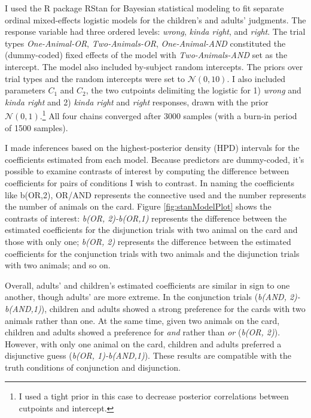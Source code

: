 \documentclass[man]{apa6}
\theoremstyle{definition}
\theoremstyle{definition}
\theoremstyle{definition}
\theoremstyle{remark}
\begin{document}
I used the R package RStan for Bayesian statistical modeling to fit
separate ordinal mixed-effects logistic models for the children's and
adults' judgments. The response variable had three ordered levels:
\emph{wrong}, \emph{kinda right}, and \emph{right}. The trial types
\emph{One-Animal-OR}, \emph{Two-Animals-OR}, \emph{One-Animal-AND}
constituted the (dummy-coded) fixed effects of the model with
\emph{Two-Animals-AND} set as the intercept. The model also included
by-subject random intercepts. The priors over trial types and the random
intercepts were set to \(\mathcal{N}(0,10)\). I also included parameters
\(C_1\) and \(C_2\), the two cutpoints delimiting the logistic for 1)
\emph{wrong} and \emph{kinda right} and 2) \emph{kinda right} and
\emph{right} responses, drawn with the prior
\(\mathcal{N}(0,1)\).\footnote{I used a tight prior in this case to
  decrease posterior correlations between cutpoints and intercept.} All
four chains converged after 3000 samples (with a burn-in period of 1500
samples).

I made inferences based on the highest-posterior density (HPD) intervals
for the coefficients estimated from each model. Because predictors are
dummy-coded, it's possible to examine contrasts of interest by computing
the difference between coefficients for pairs of conditions I wish to
contrast. In naming the coefficients like b(OR,2), OR/AND represents the
connective used and the number represents the number of animals on the
card. Figure \ref{fig:stanModelPlot} shows the contrasts of interest:
\emph{b(OR, 2)-b(OR,1)} represents the difference between the estimated
coefficients for the disjunction trials with two animal on the card and
those with only one; \emph{b(OR, 2)} represents the difference between
the estimated coefficients for the conjunction trials with two animals
and the disjunction trials with two animals; and so on.

Overall, adults' and children's estimated coefficients are similar in
sign to one another, though adults' are more extreme. In the conjunction
trials (\emph{b(AND, 2)-b(AND,1)}), children and adults showed a strong
preference for the cards with two animals rather than one. At the same
time, given two animals on the card, children and adults showed a
preference for \emph{and} rather than \emph{or} (\emph{b(OR, 2)}).
However, with only one animal on the card, children and adults preferred
a disjunctive guess (\emph{b(OR, 1)-b(AND,1)}). These results are
compatible with the truth conditions of conjunction and disjunction.
\end{document}
